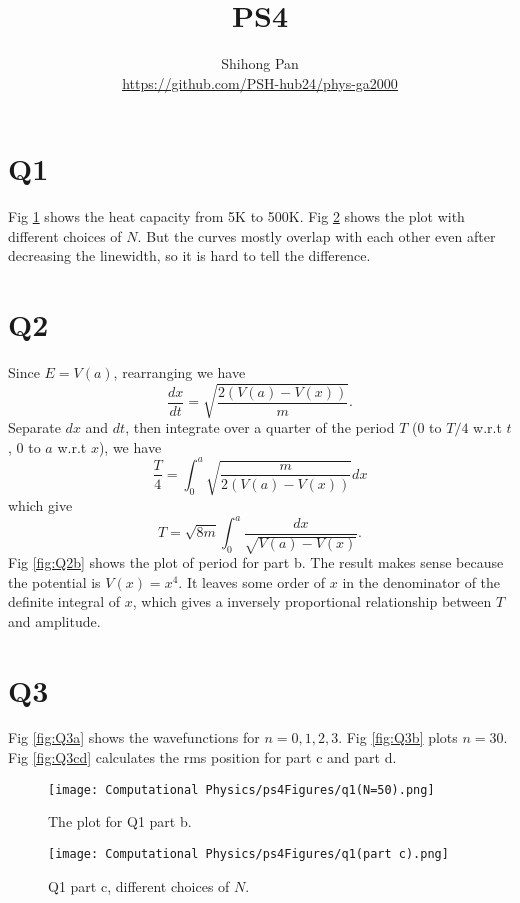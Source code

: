 \documentclass[11pt]{article}
\title{PS4}
\author{Shihong Pan\\ \url{https://github.com/PSH-hub24/phys-ga2000}}
\begin{document}
\maketitle

\section{Q1}
Fig \ref{fig:Q1b} shows the heat capacity from 5K to 500K. Fig \ref{fig:Q1c} shows the plot with different choices of $N$. But the curves mostly overlap with each other even after decreasing the linewidth, so it is hard to tell the difference.

\section{Q2}
Since $E=V(a)$, rearranging we have
\begin{equation}
    \frac{dx}{dt}=\sqrt{\frac{2(V(a)-V(x))}{m}}.
\end{equation}
Separate $dx$ and $dt$, then integrate over a quarter of the period $T$ (0 to $T/4$ w.r.t $t$, 0 to $a$ w.r.t $x$), we have
\begin{equation}
    \frac{T}{4}=\int^a_0\sqrt{\frac{m}{2(V(a)-V(x))}}dx
\end{equation}
which give
\begin{equation}
    T = \sqrt{8m}\int^a_0\frac{dx}{\sqrt{V(a)-V(x)}}.
\end{equation}
Fig \ref{fig:Q2b} shows the plot of period for part b. The result makes sense because the potential is $V(x)=x^4$. It leaves some order of $x$ in the denominator of the definite integral of $x$, which gives a inversely proportional relationship between $T$ and amplitude.

\section{Q3}
Fig \ref{fig:Q3a} shows the wavefunctions for $n=0,1,2,3$. Fig \ref{fig:Q3b} plots $n=30$. Fig \ref{fig:Q3cd} calculates the rms position for part c and part d.

\begin{figure}[b!]
\centering
\texttt{[image: Computational Physics/ps4Figures/q1(N=50).png]}
\caption{The plot for Q1 part b.}
  \label{fig:Q1b}
\end{figure}

\begin{figure}[b!]
\centering
\texttt{[image: Computational Physics/ps4Figures/q1(part c).png]}
\caption{Q1 part c, different choices of $N$.}
  \label{fig:Q1c}
\end{figure}
\end{document}

